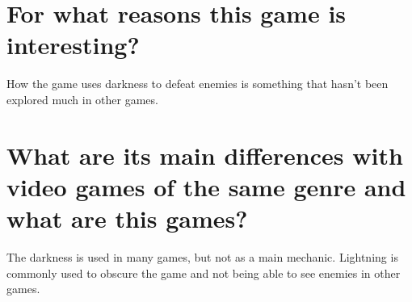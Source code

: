 \section{For what reasons this game is interesting?}
How the game uses darkness to defeat enemies is something that hasn't been explored much in other games.


\section{What are its main differences with video games of the same genre and what are this games?}
The darkness is used in many games, but not as a main mechanic. Lightning is commonly used to obscure the game and not being able to see enemies in other games.